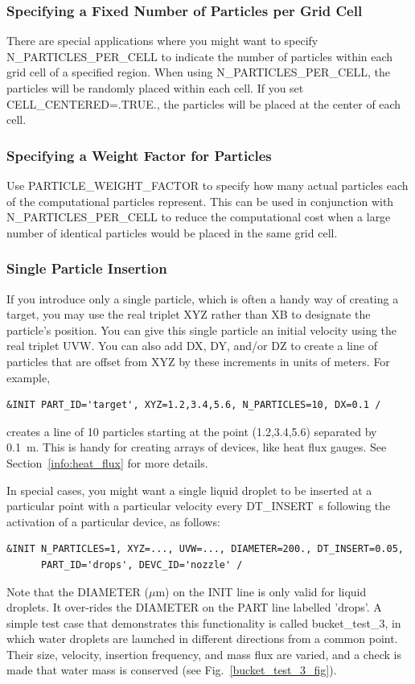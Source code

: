 \documentclass[11pt]{book}
\begin{document}
\subsubsection{Specifying a Fixed Number of Particles per Grid Cell}

There are special applications where you might want to specify {\ct N\_PARTICLES\_PER\_CELL} to indicate the number of particles within each grid cell of a specified region.
When using {\ct N\_PARTICLES\_PER\_CELL}, the particles will be randomly placed within each cell.  If you set {\ct CELL\_CENTERED=.TRUE.}, the particles will be placed at the center of each cell.

\subsubsection{Specifying a Weight Factor for Particles}

Use {\ct PARTICLE\_WEIGHT\_FACTOR} to specify how many actual particles each of the computational particles represent. This can be used in conjunction with {\ct N\_PARTICLES\_PER\_CELL} to reduce the computational cost when a large number of identical particles would be placed in the same grid cell.


\subsubsection{Single Particle Insertion}

If you introduce only a single particle, which is often a handy way of creating a target, you may use the real triplet {\ct XYZ} rather than {\ct XB} to designate the particle's position.  You can give this single particle an initial velocity using the real triplet {\ct UVW}. You can also add {\ct DX}, {\ct DY}, and/or {\ct DZ} to create a line of particles that are offset from {\ct XYZ} by these increments in units of meters. For example,
\begin{lstlisting}
&INIT PART_ID='target', XYZ=1.2,3.4,5.6, N_PARTICLES=10, DX=0.1 /
\end{lstlisting}
creates a line of 10 particles starting at the point (1.2,3.4,5.6) separated by 0.1~m. This is handy for creating arrays of devices, like heat flux gauges. See Section~\ref{info:heat_flux} for more details.

In special cases, you might want a single liquid droplet to be inserted at a particular point with a particular velocity every {\ct DT\_INSERT}~s following the activation of a particular device, as follows:
\begin{lstlisting}
&INIT N_PARTICLES=1, XYZ=..., UVW=..., DIAMETER=200., DT_INSERT=0.05,
      PART_ID='drops', DEVC_ID='nozzle' /
\end{lstlisting}
Note that the {\ct DIAMETER} ($\mu$m) on the {\ct INIT} line is only valid for liquid droplets. It over-rides the {\ct DIAMETER} on the {\ct PART} line labelled {\ct 'drops'}. A simple test case that demonstrates this functionality is called {\ct bucket\_test\_3}, in which water droplets are launched in different directions from a common point. Their size, velocity, insertion frequency, and mass flux are varied, and a check is made that water mass is conserved (see Fig.~\ref{bucket_test_3_fig}).
\end{document}
